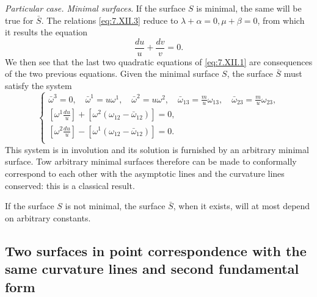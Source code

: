 \documentclass[leqno,11pt]{book}
\numberwithin{equation}{chapter}
\theoremstyle{shape1}
\theoremstyle{shape0}
\theoremstyle{shape2}
\theoremstyle{definition}
\begin{document}
\vspace{12pt}\fsec\emph{Particular case. Minimal surfaces}. If the surface $S$ is minimal, the same will be true for $\bar S$. The relations \eqref{eq:7.XII.3} reduce to $\lambda+\alpha=0,\mu+\beta=0$, from which it results the equation
\[
\frac{du}{u}+\frac{dv}{v}=0.
\]
We then see that the last two quadratic equations of \eqref{eq:7.XII.1} are consequences of the two previous equations. Given the minimal surface $S$, the surface $\bar S$ must satisfy the system
\begin{equation}
  \label{eq:7.XII.7}\tag{XII, 7}
  \left\{
    \begin{gathered}
      \bar\omega^{3}=0,\quad\bar\omega^{1}=u\omega^{1},\quad\bar\omega^{2}=u\omega^{2},\quad\bar\omega_{13}=\frac{m}{u}\omega_{13},\quad\bar\omega_{23}=\frac{m}{u}\omega_{23},\\
      \left[\omega^{1}\frac{du}{u}\right]+[\omega^{2}(\omega_{12}-\bar\omega_{12})]=0,\\
      \left[\omega^{2}\frac{du}{u}\right]-[\omega^{1}(\omega_{12}-\bar\omega_{12})]=0.\\
    \end{gathered}
  \right.
\end{equation}
This system is in involution and its solution is furnished by an arbitrary minimal surface. Tow arbitrary minimal surfaces therefore can be made to conformally correspond to each other with the asymptotic lines and the curvature lines conserved: this is a classical result.

If the surface $S$ is not minimal, the surface $\bar S$, when it exists, will at most depend on arbitrary constants.

\subsection{Two surfaces in point correspondence with the same curvature lines and second fundamental form}
\label{sec:some-surfaces-point-2}
\end{document}

